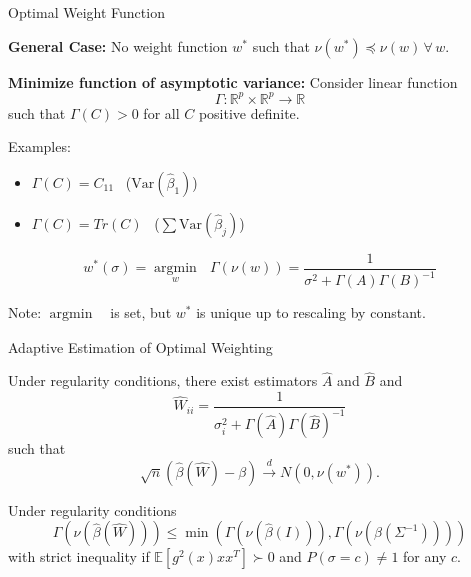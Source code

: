 \documentclass[12pt]{beamer}
\newcommand{\argmin}[1]{\underset{#1}{\operatorname{argmin}}\text{ }}
\newcommand{\Var}{\text{Var}}
\newcommand{\E}{\mathbb{E}}
\newcommand{\rightarrowd}{\overset{d}{\to}}
\begin{document}
\begin{frame}{Optimal Weight Function}

  \textbf{General Case:} No weight function $w^*$ such that $\nu(w^*) \preceq \nu(w) \, \forall \, w$.

  \vspace{.1in}
  
  \textbf{Minimize function of asymptotic variance:} Consider linear function
  \begin{equation*}
    \Gamma: \mathbb{R}^p \times \mathbb{R}^p \rightarrow \mathbb{R}
  \end{equation*}
  such that $\Gamma(C) > 0$ for all $C$ positive definite.

\vspace{.1in}
  
  Examples:
  \begin{itemize}
  \item $\Gamma(C) = C_{11} \, \, \,$ ($\Var(\widehat{\beta}_1)$)
  \item $\Gamma(C) = Tr(C) \, \, \,$ ($\sum \Var(\widehat{\beta}_j)$)
  \end{itemize}

  
  \begin{theorem}
    \begin{equation*}
      w^*(\sigma) = \argmin{w} \Gamma(\nu(w)) = \frac{1}{\sigma^2 + \Gamma(A)\Gamma(B)^{-1}}
    \end{equation*}
  \end{theorem}

Note: $\argmin{}$ is set, but $w^*$ is unique up to rescaling by constant.
  
\end{frame}
  
  \begin{frame}{Adaptive Estimation of Optimal Weighting}
    \begin{theorem}[Adaptivity]
      Under regularity conditions, there exist estimators $\widehat{A}$ and $\widehat{B}$ and
      \begin{equation*}
        \widehat{W}_{ii} = \frac{1}{\sigma_i^2 + \Gamma(\widehat{A})\Gamma(\widehat{B})^{-1}}
      \end{equation*}
      such that
      \begin{equation*}
        \sqrt{n}(\widehat{\beta}(\widehat{W}) - \beta) \rightarrowd N(0,\nu(w^*)).
      \end{equation*}
      \end{theorem}
    \begin{theorem}
      Under regularity conditions
      \begin{equation*}
        \Gamma(\nu(\widehat{\beta}(\widehat{W}))) \leq \min(\Gamma(\nu(\widehat{\beta}(I))),\Gamma(\nu(\widehat{\beta}(\Sigma^{-1}))))
      \end{equation*}
      with strict inequality if $\E[g^2(x)xx^T]\succ 0$ and $P(\sigma=c)\neq 1$ for any $c$.
      \end{theorem}

    
  \end{frame}
  
\end{document}
